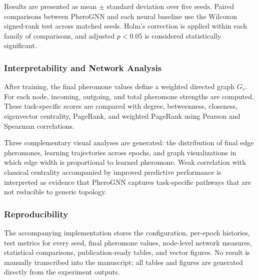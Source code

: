 Results are presented as mean $\pm$ standard deviation over five seeds. Paired comparisons between PheroGNN and each neural baseline use the Wilcoxon signed-rank test across matched seeds. Holm's correction is applied within each family of comparisons, and adjusted $p<0.05$ is considered statistically significant.

\subsubsection{Interpretability and Network Analysis}

After training, the final pheromone values define a weighted directed graph $G_\tau$. For each node, incoming, outgoing, and total pheromone strengths are computed. These task-specific scores are compared with degree, betweenness, closeness, eigenvector centrality, PageRank, and weighted PageRank using Pearson and Spearman correlations.

Three complementary visual analyses are generated: the distribution of final edge pheromones, learning trajectories across epochs, and graph visualizations in which edge width is proportional to learned pheromone. Weak correlation with classical centrality accompanied by improved predictive performance is interpreted as evidence that PheroGNN captures task-specific pathways that are not reducible to generic topology.

\subsubsection{Reproducibility}

The accompanying implementation stores the configuration, per-epoch histories, test metrics for every seed, final pheromone values, node-level network measures, statistical comparisons, publication-ready tables, and vector figures. No result is manually transcribed into the manuscript; all tables and figures are generated directly from the experiment outputs.
